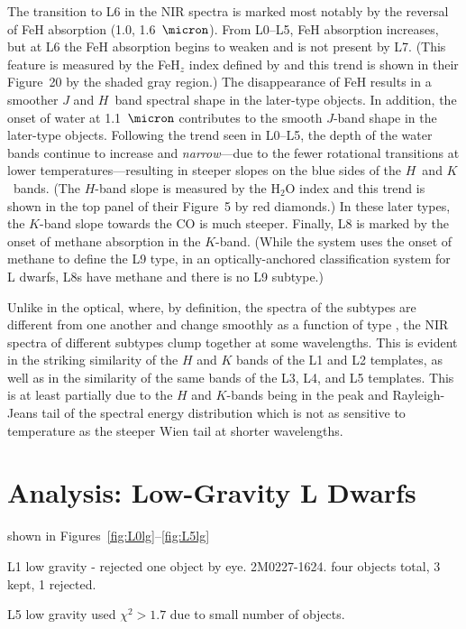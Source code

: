\documentclass[12pt,preprint]{aastex}
\begin{document}
The transition to L6 in the NIR spectra is marked most notably by the reversal of FeH absorption (1.0, 1.6~$\micron$). From L0--L5, FeH absorption increases, but at L6 the FeH absorption begins to weaken and is not present by L7. (This feature is measured by the FeH$_z$ index defined by \citet{Allers:2013hk} and this trend is shown in their Figure~20 by the shaded gray region.) The disappearance of FeH results in a smoother $J$ and $H$~band spectral shape in the later-type objects. In addition, the onset of water at 1.1~$\micron$ contributes to the smooth $J$-band shape in the later-type objects. Following the trend seen in L0--L5, the depth of the water bands continue to increase and \emph{narrow}---due to the fewer rotational transitions at lower temperatures---resulting in steeper slopes on the blue sides of the $H$~and $K$~bands. (The $H$-band slope is measured by the \citet{Allers07} H$_2$O index and this trend is shown in the top panel of their Figure~5 by red diamonds.) In these later types, the $K$-band slope towards the CO is much steeper. Finally, L8 is marked by the onset of methane absorption in the $K$-band. (While the \citet{Geballe02} system uses the onset of methane to define the L9 type, in an optically-anchored classification system for L dwarfs, L8s have methane and there is no L9 subtype.) 

Unlike in the optical, where, by definition, the spectra of the subtypes are different from one another and change smoothly as a function of type \citep{Kirkpatrick05}, the NIR spectra of different subtypes clump together at some wavelengths.
This is evident in the striking similarity of the $H$ and $K$ bands of the L1 and L2 templates, as well as in the similarity of the same bands of the L3, L4, and L5 templates.
This is at least partially due to the $H$ and $K$-bands being in the peak and Rayleigh-Jeans tail of the spectral energy distribution which is not as sensitive to temperature as the steeper Wien tail at shorter wavelengths.

\section{Analysis: Low-Gravity L Dwarfs}
\label{sec:lowg}

shown in Figures~\ref{fig:L0lg}--\ref{fig:L5lg}

L1 low gravity - rejected one object by eye. 2M0227-1624. four objects total, 3 kept, 1 rejected.

L5 low gravity used $\chi^2 > 1.7$ due to small number of objects.
\end{document}
